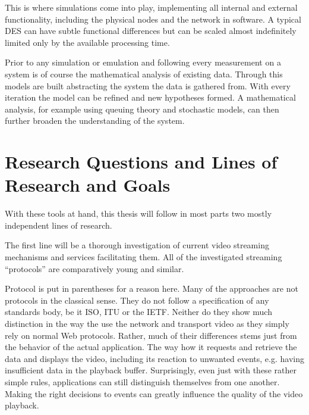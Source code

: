 This is where simulations come into play, implementing all internal and external functionality, including the physical nodes and the network in software. A typical \gls{DES} can have subtle functional differences but can be scaled almost indefinitely limited only by the available processing time. 

Prior to any simulation or emulation and following every measurement on a system is of course the mathematical analysis of existing data. Through this models are built abstracting the system the data is gathered from. With every iteration the model can be refined and new hypotheses formed.
A mathematical analysis, for example using queuing theory and stochastic models, can then further broaden the understanding of the system.




\section{Research Questions and Lines of Research and Goals}

With these tools at hand, this thesis will follow in most parts two mostly independent lines of research.

The first line will be a thorough investigation of current video streaming mechanisms and services facilitating them. All of the investigated streaming ``protocols'' are comparatively young and similar. 

Protocol is put in parentheses for a reason here. Many of the approaches are not protocols in the classical sense. They do not follow a specification of any standards body, be it \gls{ISO}, \gls{ITU} or the \gls{IETF}. Neither do they show much distinction in the way the use the network and transport video as they simply rely on normal Web protocols. Rather, much of their differences stems just from the behavior of the actual application. The way how it requests and retrieve the data and displays the video, including its reaction to unwanted events, e.g. having insufficient data in the playback buffer. 
Surprisingly, even just with these rather simple rules, applications can still distinguish themselves from one another. Making the right decisions to events can greatly influence the quality of the video playback. 

